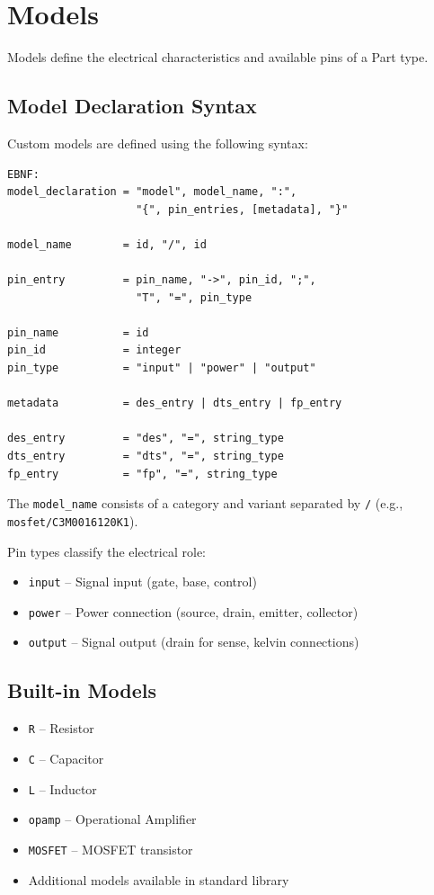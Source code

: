 \documentclass{report}
\begin{document}
\section{Models}
Models define the electrical characteristics and available pins of a Part type.

\subsection{Model Declaration Syntax}
Custom models are defined using the following syntax:
\begin{verbatim}
EBNF:
model_declaration = "model", model_name, ":",
                    "{", pin_entries, [metadata], "}"

model_name        = id, "/", id

pin_entry         = pin_name, "->", pin_id, ";",
                    "T", "=", pin_type

pin_name          = id
pin_id            = integer
pin_type          = "input" | "power" | "output"

metadata          = des_entry | dts_entry | fp_entry

des_entry         = "des", "=", string_type
dts_entry         = "dts", "=", string_type
fp_entry          = "fp", "=", string_type
\end{verbatim}

The \texttt{model\_name} consists of a category and variant separated by \texttt{/} (e.g., \texttt{mosfet/C3M0016120K1}).

Pin types classify the electrical role:
\begin{itemize}
\item \texttt{input} -- Signal input (gate, base, control)
\item \texttt{power} -- Power connection (source, drain, emitter, collector)
\item \texttt{output} -- Signal output (drain for sense, kelvin connections)
\end{itemize}

\subsection{Built-in Models}
\begin{itemize}
\item \texttt{R} -- Resistor
\item \texttt{C} -- Capacitor
\item \texttt{L} -- Inductor
\item \texttt{opamp} -- Operational Amplifier
\item \texttt{MOSFET} -- MOSFET transistor
\item Additional models available in standard library
\end{itemize}
\end{document}
